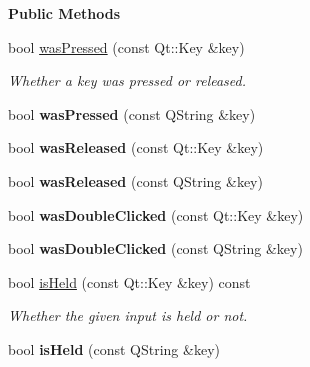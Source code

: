 \begin{Indent}\textbf{ Public Methods}\par
\begin{DoxyCompactItemize}
\item 
\mbox{\label{classrev_1_1_key_handler_a9c15a3540a0e2af055f06fb722dd5734}} 
bool \mbox{\hyperlink{classrev_1_1_key_handler_a9c15a3540a0e2af055f06fb722dd5734}{was\+Pressed}} (const Qt\+::\+Key \&key)
\begin{DoxyCompactList}\small\item\em Whether a key was pressed or released. \end{DoxyCompactList}\item 
\mbox{\label{classrev_1_1_key_handler_a00277461b90ae94bfcd7c5cb08de6a47}} 
bool {\bfseries was\+Pressed} (const Q\+String \&key)
\item 
\mbox{\label{classrev_1_1_key_handler_a7e29733b7b0911e43ed875684bd78f51}} 
bool {\bfseries was\+Released} (const Qt\+::\+Key \&key)
\item 
\mbox{\label{classrev_1_1_key_handler_a0aee78367964448e0ac596010e7d1b39}} 
bool {\bfseries was\+Released} (const Q\+String \&key)
\item 
\mbox{\label{classrev_1_1_key_handler_ac9c86bc4d6e27f53d0a0389d35381d76}} 
bool {\bfseries was\+Double\+Clicked} (const Qt\+::\+Key \&key)
\item 
\mbox{\label{classrev_1_1_key_handler_a0825dc8d247972a499e6c1614a637430}} 
bool {\bfseries was\+Double\+Clicked} (const Q\+String \&key)
\item 
\mbox{\label{classrev_1_1_key_handler_aa3a3a4fd9df920e571811179726d8c95}} 
bool \mbox{\hyperlink{classrev_1_1_key_handler_aa3a3a4fd9df920e571811179726d8c95}{is\+Held}} (const Qt\+::\+Key \&key) const
\begin{DoxyCompactList}\small\item\em Whether the given input is held or not. \end{DoxyCompactList}\item 
\mbox{\label{classrev_1_1_key_handler_aac930bd00e83cbec7a57912972dafce9}} 
bool {\bfseries is\+Held} (const Q\+String \&key)
\end{DoxyCompactItemize}
\end{Indent}
